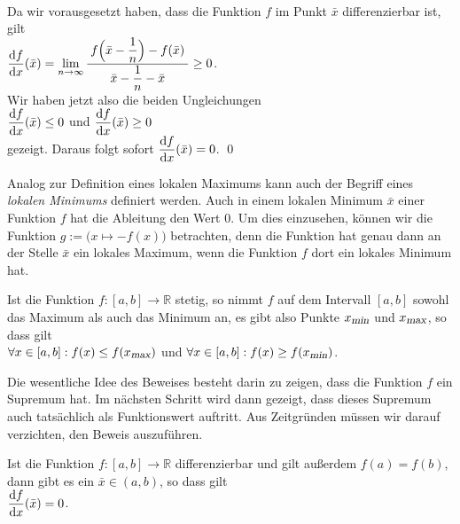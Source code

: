\\[0.3cm]
Da wir vorausgesetzt haben, dass die Funktion $f$ im Punkt $\bar{x}$ differenzierbar ist,
gilt 
\\[0.3cm]
\hspace*{1.3cm}
$\displaystyle\frac{\textrm{d}f}{\textrm{d}x}(\bar{x}) = \lim\limits_{n \rightarrow \infty} \displaystyle\frac{\;\displaystyle f\Bigl(\bar{x} - \frac{1}{n}\Bigr) - f(\bar{x})\;}{\;\displaystyle\bar{x} - \frac{1}{n} - \bar{x}\;} \geq 0$.
\\[0.3cm]
Wir haben jetzt also die beiden Ungleichungen 
\\[0.3cm]
\hspace*{1.3cm}
$\displaystyle\frac{\textrm{d}f}{\textrm{d}x}(\bar{x}) \leq 0$ \quad und \quad $\displaystyle\frac{\textrm{d}f}{\textrm{d}x}(\bar{x}) \geq 0$ 
\\[0.3cm]
gezeigt.  Daraus folgt sofort $\displaystyle\frac{\textrm{d}f}{\textrm{d}x}(\bar{x}) = 0$. \qed

\remark
Analog zur Definition eines lokalen Maximums kann auch der Begriff eines \emph{lokalen Minimums}
definiert werden.  Auch in einem lokalen Minimum $\bar{x}$ einer Funktion $f$ hat die Ableitung den Wert 0.  
Um dies einzusehen, k\"onnen wir die Funktion
$g := \bigl(x \mapsto -f(x)\bigr)$ betrachten, denn die Funktion hat genau dann an der Stelle $\bar{x}$ ein
lokales Maximum, wenn die Funktion $f$ dort ein lokales Minimum hat. \eox

\begin{Satz}
 Ist die Funktion $f:[a,b] \rightarrow \mathbb{R}$ stetig, so nimmt $f$ auf dem Intervall
 $[a,b]$ sowohl das Maximum als auch das Minimum an, es gibt also Punkte
 $x_{\textsl{\footnotesize min}}$ und  $x_{\textsl{\footnotesize max}}$, so dass gilt 
 \\[0.2cm]
 \hspace*{1.3cm}
 $\forall x \in [a,b]: f(x) \leq f(x_{\textsl{\footnotesize max}})$ \quad und \quad $\forall x \in [a,b]: f(x) \geq f(x_{\textsl{\footnotesize min}})$.
\eox
\end{Satz}

Die wesentliche Idee des Beweises besteht darin zu zeigen, dass die Funktion $f$ ein Supremum hat.
Im n\"achsten Schritt wird dann gezeigt, dass dieses Supremum auch tats\"achlich als Funktionswert auftritt.
Aus Zeitgr\"unden m\"ussen wir darauf verzichten, den Beweis auszuf\"uhren.

\begin{Satz}
  Ist die Funktion \mbox{$f:[a,b]\rightarrow \mathbb{R}$} differenzierbar und gilt au{\ss}er\-dem $f(a) = f(b)$, dann gibt es ein
  $\bar{x} \in (a,b)$, so dass gilt 
  \\[0.3cm]
  \hspace*{1.3cm}
  $\displaystyle\frac{\textrm{d}f}{\textrm{d}x}(\bar{x}) = 0$.  
\end{Satz}

